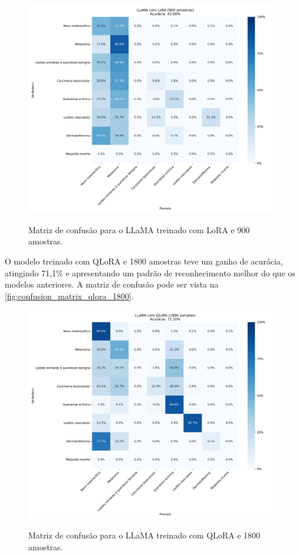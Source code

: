 \begin{figure}[ht]
    \centering
    \caption{\small Matriz de confusão para o \ac{LLaMA} treinado com \ac{LoRA} e 900 amostras.}
    \includegraphics[width=1\columnwidth,keepaspectratio]{images/confusion_matrix_lora_900.png}
    \label{fig:confusion_matrix_lora_900}
\end{figure}

O modelo treinado com \ac{QLoRA} e 1800 amostras teve um ganho de acurácia, atingindo 71,1\% e apresentando um padrão de reconhecimento melhor do que os modelos
anteriores. A matriz de confusão pode ser vista na \autoref{fig:confusion_matrix_qlora_1800}.

\clearpage

\begin{figure}[ht]
    \centering
    \caption{\small Matriz de confusão para o \ac{LLaMA} treinado com \ac{QLoRA} e 1800 amostras.}
    \includegraphics[width=1\columnwidth,keepaspectratio]{images/confusion_matrix_qlora_1800.png}
    \label{fig:confusion_matrix_qlora_1800}
\end{figure}

